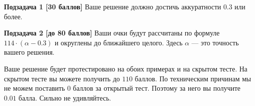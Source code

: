 {\bf Подзадача 1 [30 баллов]}
Ваше решение должно достичь аккуратности $0.3$ или более.

{\bf Подзадача 2 [до 80 баллов]}
Ваши очки будут рассчитаны по формуле $114\cdot (\alpha - 0.3)$ и округлены до ближайшего целого.
Здесь $\alpha$ --- это точность вашего решения. 

Ваше решение будет протестировано на обоих примерах и на скрытом тесте. На скрытом тесте вы можете получить до $110$ баллов. По техническим причинам мы не можем поставить $0$ баллов за открытый тест. Поэтому за него вы получите $0.01$ балла. Сильно не удивляйтесь.